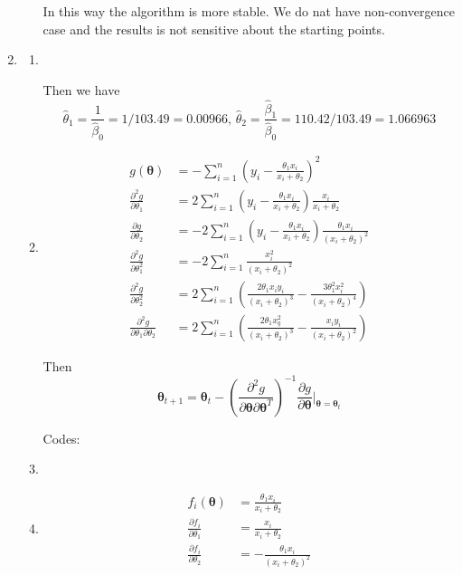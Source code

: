 \documentclass{article}
\begin{document}
\begin{enumerate}[leftmargin = 0 em, label = \arabic*., font = \bfseries]
\begin{enumerate}
		In this way the algorithm is more stable. We do nat have non-convergence case and the results is not sensitive about the starting points.


	
	\end{enumerate}

	\item 
	\begin{enumerate}
		\item \ 
		 

		Then we have 
		\[\hat{\theta}_1 = \frac{1}{\hat{\beta}_0} = 1/103.49 = 0.00966,\, \hat{\theta}_2 = \frac{\hat{\beta}_1}{\hat{\beta}_0} = 110.42 / 103.49 = 1.066963\]

		\item 
		\begin{align*}
		g(\bm \theta) & = - \sum_{i=1}^n \left( y_i - \frac{\theta_1 x_i}{x_i + \theta_2} \right)^2\\
		\frac{\partial^2 g}{\partial \theta_1} &= 2 \sum_{i=1}^n \left( y_i - \frac{\theta_1 x_i}{x_i + \theta_2} \right) \frac{x_i}{x_i + \theta_2}\\
		\frac{\partial g}{\partial \theta_2} &= -2 \sum_{i=1}^n \left( y_i - \frac{\theta_1 x_i}{x_i + \theta_2} \right) \frac{\theta_1 x_i}{(x_i + \theta_2)^2} \\
		\frac{\partial^2 g}{\partial \theta_1^2} & = -2 \sum_{i=1}^n \frac{x_i^2}{(x_i + \theta_2)^2}\\
		\frac{\partial^2 g}{\partial \theta_2^2} & = 2 \sum_{i=1}^n \left( \frac{2 \theta_1 x_i y_i}{(x_i + \theta_2)^3} - \frac{3 \theta_1^2 x_i^2}{(x_i + \theta_2)^4} \right)\\
		\frac{\partial^2 g}{\partial \theta_1 \partial \theta_2} &= 2 \sum_{i=1}^n \left( \frac{2 \theta_1 x_q^2}{(x_i + \theta_2)^3} - \frac{x_i y_i}{(x_i + \theta_2)^2} \right)  
		\end{align*}

		Then 
		\[\bm \theta_{t+1} = \bm \theta_{t} - \left(\frac{\partial^2 g}{\partial \bm \theta \partial \bm \theta^T}\right)^{-1} \frac{\partial g}{\partial \bm \theta}\bigg|_{\bm \theta = \bm \theta_t}\]

		Codes:

		
		
		\item \ 

		

		\item 
		\begin{align*}
		f_i (\bm \theta) & = \frac{\theta_1 x_i}{x_i + \theta_2}\\
		\frac{\partial f_i}{\partial \theta_1} & = \frac{x_i}{x_i + \theta_2}\\
		\frac{\partial f_i}{\partial \theta_2} & = - \frac{\theta_1 x_i}{(x_i + \theta_2)^2}
		\end{align*}


\end{enumerate}
\end{enumerate}
\end{document}
